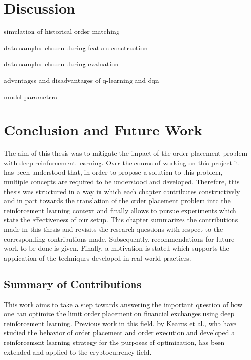 \chapter{Discussion}

simulation of historical order matching

data samples chosen during feature construction

data samples chosen during evaluation

advantages and disadvantages of q-learning and dqn

model parameters

\chapter{Conclusion and Future Work}
\label{chap:conclusion}

The aim of this thesis was to mitigate the impact of the order placement problem with deep reinforcement learning.
Over the course of working on this project it has been understood that, in order to propose a solution to this problem, multiple concepts are required to be understood and developed.
Therefore, this thesis was structured in a way in which each chapter contributes constructively and in part towards the translation of the order placement problem into the reinforcement learning context and finally allows to pursue experiments which state the effectiveness of our setup.
This chapter summarizes the contributions made in this thesis and revisits the research questions with respect to the corresponding contributions made.
Subsequently, recommendations for future work to be done is given.
Finally, a motivation is stated which supports the application of the techniques developed in real world practices.

\section{Summary of Contributions}

This work aims to take a step towards answering the important question of how one can optimize the limit order placement on financial exchanges using deep reinforcement learning.
Previous work in this field, by Kearns et al., who have studied the behavior of order placement and order execution\cite{nevmyvaka2005electronic} and developed a reinforcement learning strategy\cite{nevmyvaka2006reinforcement} for the purposes of optimization, has been extended and applied to the cryptocurrency field.

